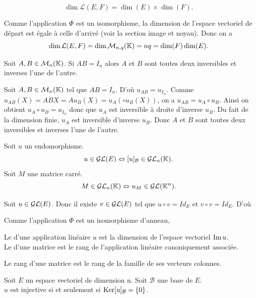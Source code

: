 \documentclass{book}
\begin{document}
\begin{Corollaire}
$$\dim \mathcal{L}(E,F) = \dim(E) \times\dim(F).$$
\end{Corollaire}
\begin{Demonstration}
Comme l'application $\Phi$ est un isomorphisme, la dimension de l'espace vectoriel de départ est égale à celle d'arrivé (voir la section image et noyau). Donc on a $$\dim \mathcal{L}(E,F)=\dim \M{n}{q}{\K}= n q= \dim (F)\dim (E).$$ 
\end{Demonstration}

\begin{Proposition}
Soit $A,B\in \MnK$.
Si $AB=I_n$ alors $A$ et $B$ sont toutes deux inversibles et inverses l'une de l'autre.
\end{Proposition}
\begin{Demonstration}
Soit $A,B\in \MnK$ tel que $AB=I_n$. D'où $u_{AB}=u_{I_n}$.  Comme $u_{AB}(X)=ABX=A u_{B}(X) =u_{A}(\circ u_{B}(X))$, on a $u_{AB}=u_{A}\circ u_{B}$. Ainsi on obtient $u_{A}\circ u_{B}=u_{I_n}$ donc que  $u_{A}$ est inversible à droite d'inverse $u_{B}$. Du fait de la dimension finie,  $u_{A}$ est inversible d'inverse $u_{B}$. Donc $A$ et $B$ sont toutes deux inversibles et inverses l'une de l'autre.
\end{Demonstration}

\begin{Proposition}
Soit $u$ un endomorphisme. 
$$u\in\GLE\Leftrightarrow [u]_\mathcal{B}\in \GLnK.$$
Soit $M$ une matrice carré.
$$M \in \GLnK \Leftrightarrow u_M\in \GLE[\K^n] .$$
\end{Proposition}



\begin{Demonstration}
Soit $u\in\GLE$. Donc il existe $v\in\GLE$ tel que $u\circ v=Id_E$ et $v\circ v =Id_E$. D'où    

Comme l'application $\Phi$ est un isomorphisme d'anneau, 
\end{Demonstration}



\begin{Definition}[Rang] Le  d'une  application linéaire $u$ est  la dimension de l'espace vectoriel $\Ima u$.\\
Le  d'une matrice est le rang de l'application linéaire canoniquement associée.
\end{Definition}
\begin{Proposition} Le rang d'une matrice est le rang de la famille de ses vecteurs colonnes. 
\end{Proposition}
\begin{Proposition}[Dualité]
Soit $E$ un espace vectoriel de dimension n. Soit $\mathcal{B}$ une base de $E$. \\
$u$ est injective si et seulement si $\Ker [u]_\mathcal{B}=\{0\}$.
\end{Proposition}
\end{document}
